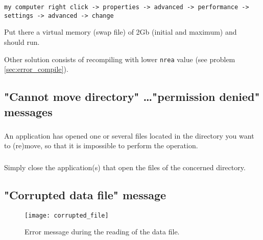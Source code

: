 \begin{verbatim}
my computer right click -> properties -> advanced -> performance -> 
settings -> advanced -> change
\end{verbatim}

Put there a virtual memory (swap file) of 2Gb (initial and maximum) and 
\diva\, should run. 


Other solution consists of recompiling with lower \texttt{nrea} value (see problem \ref{sec:error_compile}).



\subsection{"Cannot move directory" \ldots "permission denied" messages}



\subsubsection{\question}

An application has opened one or several files located in the directory you want to (re)move, so that it is impossible to perform the operation.

\subsubsection{\answer}

Simply close the application(s) that open the files of the concerned directory.



\subsection{"Corrupted data file" message}


\begin{figure}[htpb]
\centering
\texttt{[image: corrupted\_file]}
\caption{Error message during the reading of the data file.}
\end{figure}

